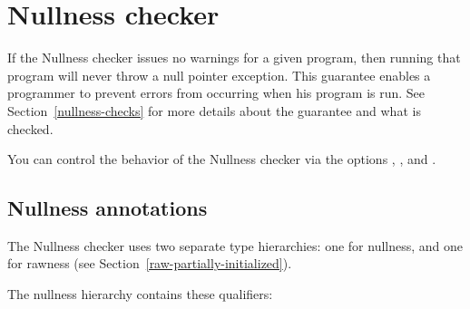 \htmlhr
\section{Nullness checker\label{nullness-checker}}

If the Nullness checker issues no warnings for a given program, then
running that program will never throw a null pointer exception.  This
guarantee enables a programmer to prevent errors from occurring when his
program is run.  See Section~\ref{nullness-checks} for more details about
the guarantee and what is checked.


You can control the behavior of the Nullness checker via the 
options , , and .



\subsection{Nullness annotations}

The Nullness checker uses two separate type hierarchies:  one for nullness,
and one for rawness (see Section~\ref{raw-partially-initialized}).

The nullness hierarchy contains these qualifiers:

